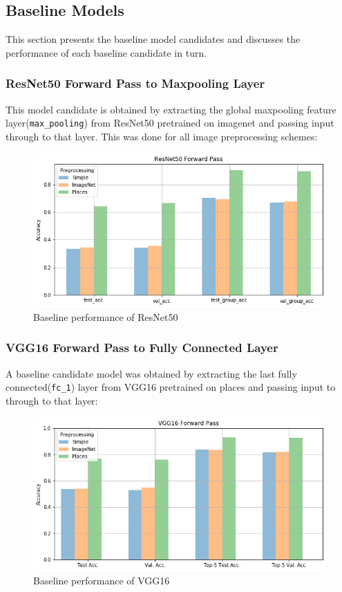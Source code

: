 \subsection{Baseline Models} \label{sec:baselinemodels}
This section presents the baseline model candidates and discusses the performance of each baseline candidate in turn.

\subsubsection{ResNet50 Forward Pass to Maxpooling Layer}
This model candidate is obtained by extracting the global maxpooling feature layer(\texttt{max\_pooling}) from ResNet50 pretrained on imagenet and passing input through to that layer. This was done for all image preprocessing schemes:

\begin{figure}[H]
    \centering
    \includegraphics[scale=0.5]{pictures/plots/resnet50_fc_acc}
    \caption{Baseline performance of ResNet50}
    \label{fig:baselineresnet}
\end{figure}

\subsubsection{VGG16 Forward Pass to Fully Connected Layer}
A baseline candidate model was obtained by extracting the last fully connected(\texttt{fc\_1}) layer from VGG16 pretrained on places and passing input to through to that layer:

\begin{figure}[H]
    \centering
    \includegraphics[scale=0.5]{pictures/plots/vgg_fc_acc}
    \caption{Baseline performance of VGG16}
    \label{fig:baselinevgg}
\end{figure}

